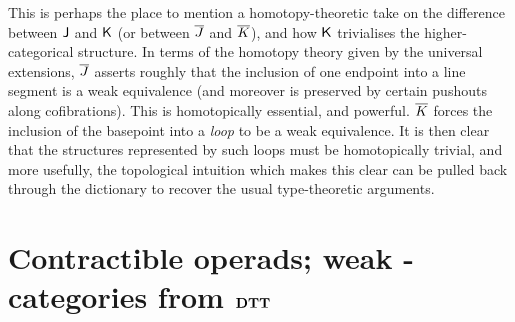 \begin{para} \label{para:j-and-k-homotopically}
This is perhaps the place to mention a homotopy-theoretic take on the difference between $\mathsf{J}$ and $\mathsf{K}$ (or between $\overline{J}$ and $\overline{K}$), and how $\mathsf{K}$ trivialises the higher-categorical structure.  In terms of the homotopy theory given by the universal extensions, $\overline{J}$ asserts roughly that the inclusion of one endpoint into a line segment is a weak equivalence (and moreover is preserved by certain pushouts along cofibrations).  This is homotopically essential, and powerful.  $\overline{K}$ forces the inclusion of the basepoint into a \emph{loop} to be a weak equivalence.  It is then clear that the structures represented by such loops must be homotopically trivial, and more usefully, the topological intuition which makes this clear can be pulled back through the dictionary to recover the usual type-theoretic arguments.
\end{para}







 


















\section{Contractible operads; weak \pdfomega-categories from \texorpdfstring{$\mathbf{DTT}$}{DTT}} \label{sec:contractibility}



